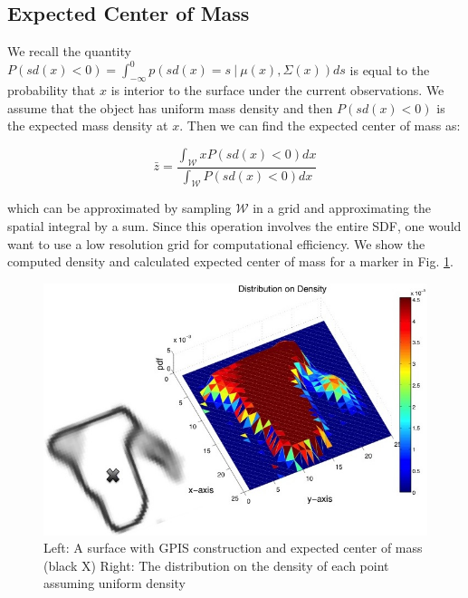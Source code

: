 \documentclass[letterpaper, 10 pt, conference]{ieeeconf}  %
\begin{document}
\subsection{Expected Center of Mass}\label{sec:mass} 

We recall the quantity $P(sd(x) < 0) = \int_{-\infty}^{0} p(sd(x) =  s \ | \ \mu(x),\Sigma(x)) ds$ is equal to the probability that $x$ is interior to the surface under the current observations.
We assume that the object has uniform mass density and then $P(sd(x) < 0)$ is the expected mass density at $x$.
Then we can find the expected center of mass as:

\label{eq:mass}
\begin{equation}
  \bar{z} 
  =
  \frac
    {\int_{\mathcal{W}}x P(sd(x)<0) dx}
    {\int_{\mathcal{W}}  P(sd(x)<0) dx}
\end{equation}

which can be approximated by sampling $\mathcal{W}$ in a grid and approximating the spatial integral by a sum. Since this operation involves the entire SDF, one would want to use a low resolution grid for computational efficiency. We show the computed density and calculated expected center of mass for a marker in Fig. \ref{fig:GPIS_MASS}.


\begin{figure}[ht!]
\centering
\includegraphics[scale = 0.3]{figures/Slide06.jpg}
\caption{ \footnotesize Left: A surface with GPIS construction and expected center of mass (black X)
Right: The distribution on the density of each point assuming uniform density}
\vspace*{-10pt}
\label{fig:GPIS_MASS}
\end{figure}
\end{document}

